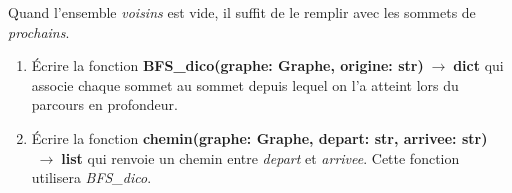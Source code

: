 \documentclass[a4paper,11pt]{article}
\begin{document}
\begin{Form}
\begin{exo}
\begin{itemize}
\end{itemize}
Quand l'ensemble \emph{voisins} est vide, il suffit de le remplir avec les sommets de \emph{prochains}.
\begin{enumerate}
\item Écrire la fonction \textbf{BFS\_dico(graphe: Graphe, origine: str)$\;\rightarrow\;$dict} qui associe chaque sommet au sommet depuis lequel on l'a atteint lors du parcours en profondeur.
\item Écrire la fonction \textbf{chemin(graphe: Graphe, depart: str, arrivee: str)$\;\rightarrow\;$list} qui renvoie un chemin entre \emph{depart} et \emph{arrivee}. Cette fonction utilisera \emph{BFS\_dico}.
\end{enumerate}
\end{exo}
\end{Form}
\end{document}
